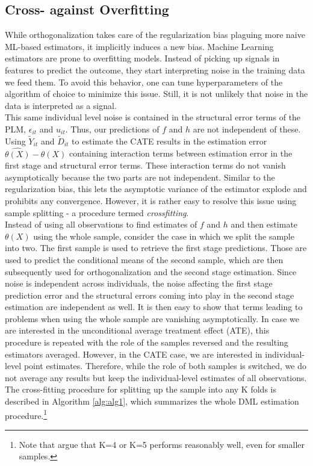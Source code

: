 \subsection{Cross- against Overfitting} \label{sec:cross-fitting}
While orthogonalization takes care of the regularization bias plaguing more naive ML-based estimators, it implicitly induces a new bias. Machine Learning estimators are prone to overfitting models. Instead of picking up signals in features to predict the outcome, they start interpreting noise in the training data we feed them. To avoid this behavior, one can tune hyperparameters of the algorithm of choice to minimize this issue. Still, it is not unlikely that noise in the data is interpreted as a signal. \\
This same individual level noise is contained in the structural error terms of the PLM, $\epsilon_{it}$ and $u_{it}$. Thus, our predictions of $f$ and $h$ are not independent of these. Using $\tilde{Y}_{it}$ and $\tilde{D}_{it}$ to estimate the CATE results in the estimation error $\hat{\theta(X)} - \theta(X)$ containing interaction terms between estimation error in the first stage and structural error terms. These interaction terms do not vanish asymptotically because the two parts are not independent. Similar to the regularization bias, this lets the asymptotic variance of the estimator explode and prohibits any convergence. However, it is rather easy to resolve this issue using sample splitting - a procedure termed \textit{crossfitting}. \\ 
Instead of using all observations to find estimates of $f$ and $h$ and then estimate $\theta(X)$ using the whole sample, consider the case in which we split the sample into two. The first sample is used to retrieve the first stage predictions. Those are used to predict the conditional means of the second sample, which are then subsequently used for orthogonalization and the second stage estimation. Since noise is independent across individuals, the noise affecting the first stage prediction error and the structural errors coming into play in the second stage estimation are independent as well. It is then easy to show that terms leading to problems when using the whole sample are vanishing asymptotically. In case we are interested in the unconditional average treatment effect (ATE), this procedure is repeated with the role of the samples reversed and the resulting estimators averaged. However, in the CATE case, we are interested in individual-level point estimates. Therefore, while the role of both samples is switched, we do not average any results but keep the individual-level estimates of all observations. The cross-fitting procedure for splitting up the sample into any K folds is described in Algorithm \ref{alg:alg1}, which summarizes the whole DML estimation procedure.\footnote{Note that \cite{DML2017} argue that K=4 or K=5 performs reasonably well, even for smaller samples.} 

